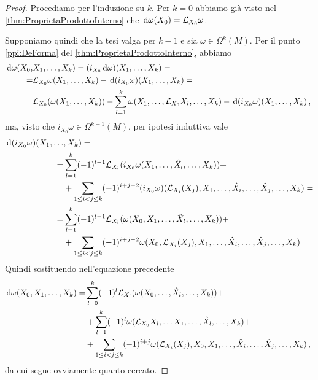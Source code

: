 \begin{proof}
	Procediamo per l'induzione su $k$.
	Per $k=0$ abbiamo già visto nel \cref{thm:ProprietaProdottoInterno} che $\de \omega (X_0) = \Lie_{X_0} \omega$.
	
	Supponiamo quindi che la tesi valga per $k-1$ e sia $\omega \in \Omega^k(M)$. Per il punto \ref{ppi:DeForma} del \cref{thm:ProprietaProdottoInterno}, abbiamo
	\begin{align*}
		\de \omega  (X_0, &\seqb Xk,) = (i_{X_0}\de \omega)(\seqb Xk,) =\\
		=&\Lie_{X_0}\omega(\seqb Xk,) - \de (i_{X_0} \omega) (\seqb Xk,) =\\
		=& \Lie_{X_0}(\omega(\seqb Xk,)) - \sum_{l=1}^k \omega (X_1,\ldots,\Lie_{X_0}X_l,\ldots, X_k)-\de (i_{X_0}\omega) (\seqb Xk,) \virgola
	\end{align*}
	ma, visto che $i_{X_0}\omega \in \Omega^{k-1}(M)$, per ipotesi induttiva vale
	\begin{align*}
		\de (i_{X_0}\omega) (X_1,\ldots & ,X_k) =\\
		=&\sum_{l=1}^{k} (-1)^{l-1} \Lie_{X_l}(i_{X_0}\omega (X_1,\ldots, \hat X_l, \ldots, X_k)) +\\
		&+\sum_{1\le i< j \le k} (-1)^{i+j-2} (i_{X_0}\omega)(\Lie_{X_i}(X_j),X_1,\ldots, \hat X_i, \ldots, \hat X_j,\ldots, X_k) =\\
		=& \sum_{l=1}^{k} (-1)^{l-1} \Lie_{X_l}(\omega (X_0,X_1,\ldots, \hat X_l, \ldots, X_k)) +\\
		&+\sum_{1\le i< j \le k} (-1)^{i+j-2} \omega(X_0,\Lie_{X_i}(X_j),X_1,\ldots, \hat X_i, \ldots, \hat X_j,\ldots, X_k)
	\end{align*}
	Quindi sostituendo nell'equazione precedente
	\begin{align*}
		\de \omega (X_0,\seqb Xk,) =&\sum_{l=0}^{k} (-1)^l \Lie_{X_l}(\omega(X_0, \ldots, \hat X_l,\ldots, X_k)) +\\
		&+\sum_{l=1}^k(-1)^l\omega(\Lie_{X_0}X_l,\ldots X_1,\ldots,\hat X_l,\ldots ,X_k)+\\
		&+\sum_{1\le i<j \le k} (-1)^{i+j} \omega (\Lie_{X_i}(X_j),X_0,X_1,\ldots,\hat X_i,\ldots,\hat X_j,\ldots,X_k) \virgola
	\end{align*}
	da cui segue ovviamente quanto cercato.
\end{proof}

